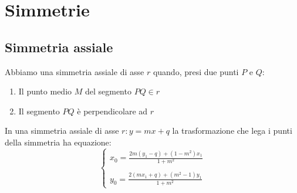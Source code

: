 
\chapter{Simmetrie}\label{ch:simmetrie} 
\section{Simmetria assiale}\label{sec:simmetria-assiale}
\begin{defn}\label{defn:Sassiale1}
Abbiamo una simmetria assiale di asse $r$ quando, presi due punti $P$ e $Q$:
\begin{enumerate}
	\item Il punto medio $M$ del segmento $PQ\in r$
	\item Il segmento $PQ$ è perpendicolare ad $r$
\end{enumerate} 
\end{defn}
\begin{thm}\label{thm:Sassiale1}
In una simmetria assiale di asse $r:y=mx+q$ la trasformazione che lega i punti della simmetria ha equazione:
\[\begin{cases}
x_0=\frac{2m(y_1-q)+(1-m^2)x_1}{1+m^2}\\
\\
y_0=\frac{2(mx_1+q)+(m^2-1)y_1}{1+m^2}
\end{cases}\]
\end{thm}
